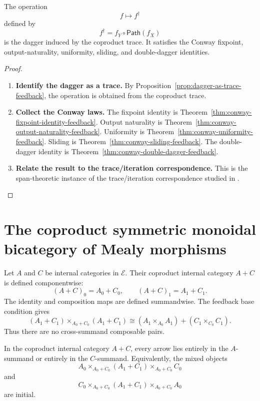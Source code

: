 \begin{theorem}
\label{thm:trace-induced-conway-operator}
The operation
\[
  f\longmapsto f^\dagger
\]
defined by
\[
  f^\dagger=f_Y\circ\mathsf{Path}(f_X)
\]
is the dagger induced by the coproduct trace. It satisfies the Conway
fixpoint, output-naturality, uniformity, sliding, and double-dagger
identities.
\end{theorem}

\begin{proof}
\begin{enumerate}
  \item \textbf{Identify the dagger as a trace.}
  By Proposition~\ref{prop:dagger-as-trace-feedback}, the operation is
  obtained from the coproduct trace.

  \item \textbf{Collect the Conway laws.}
  The fixpoint identity is
  Theorem~\ref{thm:conway-fixpoint-identity-feedback}. Output naturality is
  Theorem~\ref{thm:conway-output-naturality-feedback}. Uniformity is
  Theorem~\ref{thm:conway-uniformity-feedback}. Sliding is
  Theorem~\ref{thm:conway-sliding-feedback}. The double-dagger identity is
  Theorem~\ref{thm:conway-double-dagger-feedback}.

  \item \textbf{Relate the result to the trace/iteration correspondence.}
  This is the span-theoretic instance of the trace/iteration correspondence
  studied in
  \cite{BloomEsik1993IterationTheories,Hasegawa1997RecursionCyclicSharing,Hasegawa2004Uniformity}.
\end{enumerate}
\end{proof}

\section{The coproduct symmetric monoidal bicategory of Mealy morphisms}
\label{sec:coproduct-symmetric-monoidal-bicategory-mealy}

Let \(A\) and \(C\) be internal categories in \(\mathcal E\). Their coproduct
internal category \(A+C\) is defined componentwise:
\[
  (A+C)_0=A_0+C_0,
  \qquad
  (A+C)_1=A_1+C_1.
\]
The identity and composition maps are defined summandwise. The feedback base
condition gives
\[
  (A_1+C_1)\times_{A_0+C_0}(A_1+C_1)
  \cong
  (A_1\times_{A_0}A_1)
  +
  (C_1\times_{C_0}C_1).
\]
Thus there are no cross-summand composable pairs.

\begin{lemma}
\label{lem:no-cross-arrows-coproduct-internal-categories}
In the coproduct internal category \(A+C\), every arrow lies entirely in the
\(A\)-summand or entirely in the \(C\)-summand. Equivalently, the mixed
objects
\[
  A_0\times_{A_0+C_0}(A_1+C_1)\times_{A_0+C_0}C_0
\]
and
\[
  C_0\times_{A_0+C_0}(A_1+C_1)\times_{A_0+C_0}A_0
\]
are initial.
\end{lemma}

